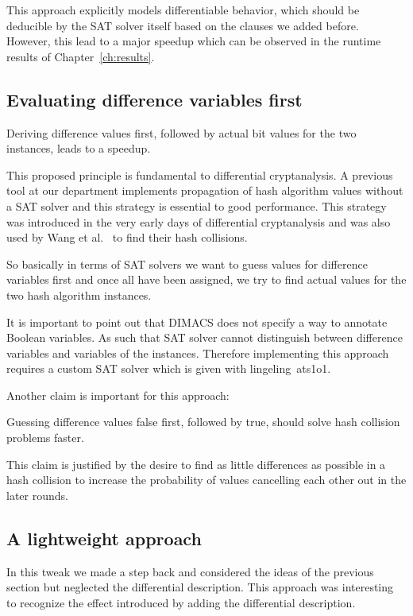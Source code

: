 This approach explicitly models differentiable behavior, which should be deducible
by the SAT solver itself based on the clauses we added before.
However, this lead to a major speedup which can be observed in the runtime results
of Chapter~\ref{ch:results}.

\newpage
\subsection{Evaluating difference variables first}
\label{sec:enc-diff-desc-ocnf}
%
\begin{prop}
  Deriving difference values first, followed by actual bit values for the two instances,
  leads to a speedup.
\end{prop}

This proposed principle is fundamental to differential cryptanalysis. A previous tool
at our department implements propagation of hash algorithm values without a SAT solver
and this strategy is essential to good performance. This strategy was introduced
in the very early days of differential cryptanalysis and was also used by Wang et
al.~\cite{wang2004} to find their hash collisions.

So basically in terms of SAT solvers we want to guess values for difference variables
first and once all have been assigned, we try to find actual values for the two
hash algorithm instances.

It is important to point out that DIMACS does not specify a way to annotate Boolean
variables. As such that SAT solver cannot distinguish between difference variables
and variables of the instances. Therefore implementing this approach requires a custom
SAT solver which is given with lingeling~ats1o1.

Another claim is important for this approach:

\begin{prop}
  \label{prop:false-first}
  Guessing difference values false first, followed by true,
  should solve hash collision problems faster.
\end{prop}

This claim is justified by the desire to find as little differences as possible
in a hash collision to increase the probability of values cancelling each other out
in the later rounds.

\subsection{A lightweight approach}
\label{sec:enc-lightweight}
%
In this tweak we made a step back and considered the ideas of the previous
section but neglected the differential description. This approach was interesting
to recognize the effect introduced by adding the differential description.

